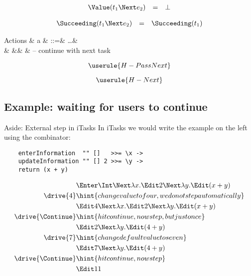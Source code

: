 \begin{equation*}
  \begin{array}{lcl}
    \Value(t_1 \Next e_2) &=& \bot
  \end{array}
\end{equation*}

\begin{equation*}
  \begin{array}{lcl}
    \Succeeding(t_1 \Next e_2) &=& \Succeeding(t_1)
  \end{array}
\end{equation*}

\begin{grammar}
  Actions
    & a & ::=& \ldots & \\
    &   &\mid& \Continue  & – continue with next task \\
\end{grammar}

\begin{equation*}
  \userule{H-PassNext}
\end{equation*}

\begin{equation*}
  \userule{H-Next}
\end{equation*}


\subsection{Example: waiting for users to continue}

\begin{margintext}{Aside: External step in iTasks}
  In iTasks we would write the example on the left using the \type{>>=} combinator:
  \begin{verbatim}
    enterInformation  "" []   >>= \x ->
    updateInformation "" [] 2 >>= \y ->
    return (x + y)
  \end{verbatim}
\end{margintext}

\begin{align*}
    & \Enter \Int \Next \lambda x. \Edit 2 \Next \lambda y. \Edit (x + y) \\
  \drive{4} & \hint{change value to four, we do not step automatically} \\
    & \Edit 4 \Next \lambda x. \Edit 2 \Next \lambda y. \Edit (x + y) \\
  \drive{\Continue} & \hint{hit continue, now step, but just once} \\
    & \Edit 2 \Next \lambda y. \Edit (4 + y) \\
  \drive{7} & \hint{change default value to seven} \\
    & \Edit 7 \Next \lambda y. \Edit (4 + y) \\
  \drive{\Continue} & \hint{hit continue, now step} \\
    & \Edit 11 \\
\end{align*}
